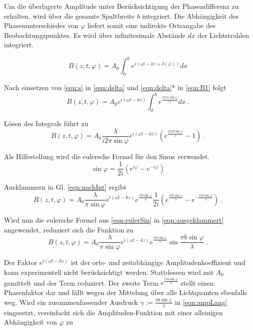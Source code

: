 Um die überlagerte Amplitude unter Berücksichtigung der Phasendifferenz zu erhalten, wird über die gesamte Spaltbreite $b$ integriert.
Die Abhängigkeit des Phasenunterschiedes von $\varphi$ liefert somit eine indirekte Ortsangabe des Beobachtungspunktes.
Es wird über infinitesimale Abstände $dx$ der Lichtstrahlen integriert.

\begin{equation}
  B(z, t, \varphi) = A_0\int_0^be^{i(\omega t - kz + \delta(\varphi))}dx
  \label{eqn:B1}
\end{equation}

Nach einsetzen von \eqref{eqn:s} in \eqref{eqn:delta} und \eqref{eqn:delta}* in \eqref{eqn:B1} folgt
\begin{equation*}
  B(z, t, \varphi) = A_0e^{i(\omega t - kz)}\int_0^be^{\frac{i2\pi x \sin{\varphi}}{\lambda}}dx \:.
\end{equation*}

Lösen des Integrals führt zu
\begin{equation}
  B(z, t, \varphi) = A_0\frac{\lambda}{i2\pi \sin{\varphi}}e^{i(\omega t - kz)}(e^{\frac{i2\pi b \sin{\varphi}}{\lambda}}-1) \:.
  \label{eqn:nachInt}
\end{equation}

Als Hilfestellung wird die eulersche Formel für den Sinus verwendet.
\begin{equation}
  \sin{\varphi} = \frac{1}{2i}(e^{i\varphi}-e^{-i\varphi})
  \label{eqn:eulerSin}
\end{equation}

Ausklammern in Gl. \eqref{eqn:nachInt} ergibt
\begin{equation}
  B(z, t, \varphi) = A_0\frac{\lambda}{\pi \sin{\varphi}}e^{i(\omega t - kz)}e^{\frac{i\pi b \sin{\varphi}}{\lambda}}\frac{1}{2i}(e^{\frac{i\pi b \sin{\varphi}}{\lambda}}-e^{-\frac{i\pi b \sin{\varphi}}{\lambda}}) \:.
  \label{eqn:ausgeklammert}
\end{equation}

Wird nun die eulersche Formel aus \eqref{eqn:eulerSin} in \eqref{eqn:ausgeklammert} angewendet, reduziert sich die Funktion zu
\begin{equation}
  B(z, t, \varphi) = A_0\frac{\lambda}{\pi \sin{\varphi}}e^{i(\omega t - kz)}e^{\frac{i\pi b \sin{\varphi}}{\lambda}}\sin{\frac{\pi b \sin{\varphi}}{\lambda}} \:.
  \label{eqn:ampLang}
\end{equation}

Der Faktor $e^{i(\omega t - kz)}$ ist der orts- und zeitabhängige Amplitudenkoeffizient und kann experimentell nicht berücksichtigt werden. Stattdessen wird mit $A_0$ gemittelt
und der Term reduziert.
Der zweite Term $e^{\frac{i\pi b \sin{\varphi}}{\lambda}}$ stellt einen Phasenfaktor dar und fällt wegen der Mittelung über alle Lichtquanten ebenfalls weg.
Wird ein zusammenfassender Ausdruck $\gamma := \frac{\pi b \sin{\varphi}}{\lambda}$ in \eqref{eqn:ampLang} eingesetzt, vereinfacht sich die Amplituden-Funktion mit einer alleinigen Abhängigkeit von $\varphi$ zu

